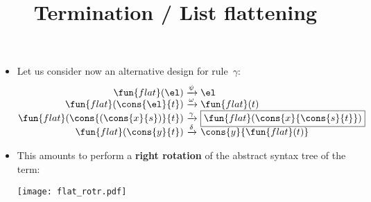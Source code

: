 \documentclass[wide]{slides}
\begin{document}
\begin{slide}
  \title{Termination / List flattening}

  \begin{itemize}

    \item Let us consider now an alternative design for
      rule~\(\gamma\):
      \begin{equation*}
          \begin{array}{@{}r@{\;}c@{\;}l@{}}
            \fun{flat}(\el) & \xrightarrow{\psi}
                                      & \el\\
            \fun{flat}(\cons{\el}{t}) & \xrightarrow{\smash{\omega}}
                                      & \fun{flat}(t)\\
            \fun{flat}(\cons{(\cons{x}{s})}{t})
                                      & \xrightarrow{\smash{\gamma}}
                                      & \fbox{\(\fun{flat}(\cons{x}{\cons{s}{t}})\)}\\
            \fun{flat}(\cons{y}{t})   & \xrightarrow{\smash{\delta}}
                                      & \cons{y}{\fun{flat}(t)}
          \end{array}
        \end{equation*}

    \item This amounts to perform a \textbf{right rotation} of the
      abstract syntax tree of the term:
      \begin{center}
        \texttt{[image: flat\_rotr.pdf]}
      \end{center}

  \end{itemize}

\end{slide}
\end{document}
